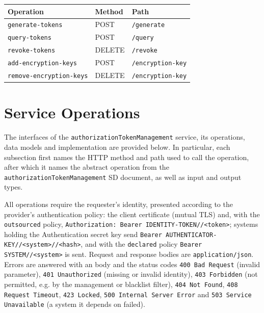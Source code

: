 \documentclass[a4paper]{arrowhead}
\newcommand{\mref}[2][]{{\textcolor{ArrowheadPurple}{\hyperref[sec:model:#2]{\ifstrempty{#1}{#2}{#1}}}}}
\begin{document}
\noindent\begin{longtable}{| p{5.2cm} | p{1.6cm} | p{8.4cm} |} \hline
\rowcolor{gray!33} Operation & Method & Path \\ \hline \endhead
\texttt{generate-\allowbreak{}tokens} & POST & \texttt{/\allowbreak{}generate} \\ \hline
\texttt{query-\allowbreak{}tokens} & POST & \texttt{/\allowbreak{}query} \\ \hline
\texttt{revoke-\allowbreak{}tokens} & DELETE & \texttt{/\allowbreak{}revoke} \\ \hline
\texttt{add-\allowbreak{}encryption-\allowbreak{}keys} & POST & \texttt{/\allowbreak{}encryption-\allowbreak{}key} \\ \hline
\texttt{remove-\allowbreak{}encryption-\allowbreak{}keys} & DELETE & \texttt{/\allowbreak{}encryption-\allowbreak{}key} \\ \hline
\end{longtable}

\newpage

\section{Service Operations}
\label{sec:operations}

The interfaces of the \texttt{authorization\allowbreak{}Token\allowbreak{}Management} service, its operations, data models and implementation are provided below.
In particular, each subsection first names the HTTP method and path used to call the operation, after which it names the abstract operation from the \texttt{authorization\allowbreak{}Token\allowbreak{}Management} SD document, as well as input and output types.

All operations require the requester's identity, presented according to the provider's authentication policy: the client certificate (mutual TLS) and, with the \texttt{outsourced} policy, \texttt{Authorization: Bearer IDENTITY-TOKEN//<token>}; systems holding the Authentication secret key send \texttt{Bearer AUTHENTICATOR-KEY//<system>//<hash>}, and with the \texttt{declared} policy \texttt{Bearer SYSTEM//<system>} is sent. Request and response bodies are \texttt{application/json}.
Errors are answered with an \mref{ErrorMessage} body and the status codes \texttt{400 Bad Request} (invalid parameter), \texttt{401 Unauthorized} (missing or invalid identity), \texttt{403 Forbidden} (not permitted, e.g. by the management or blacklist filter), \texttt{404 Not Found}, \texttt{408 Request Timeout}, \texttt{423 Locked}, \texttt{500 Internal Server Error} and \texttt{503 Service Unavailable} (a system it depends on failed).
\end{document}
